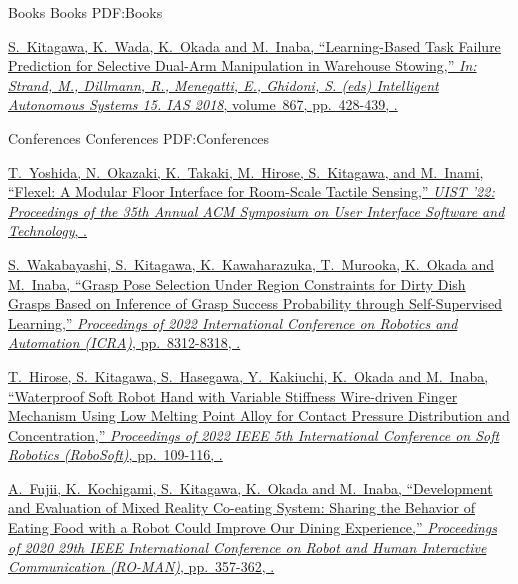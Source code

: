 \documentclass[letterpaper,MMMyyyy,nonstopmode]{simpleresumecv}
\begin{document}
\begin{Body}
\endgroup

\BigGap
\SubSection
{Books}
{Books}
{PDF:Books}

\begingroup

\BulletItem
\href{https://doi.org/10.1007/978-3-030-01370-7_34}
{\underline{S.~Kitagawa}, K.~Wada, K.~Okada and M.~Inaba,
``Learning-Based Task Failure Prediction for Selective Dual-Arm Manipulation in Warehouse Stowing,''
\textit{In: Strand, M., Dillmann, R., Menegatti, E., Ghidoni, S. (eds) Intelligent Autonomous Systems 15. IAS 2018},
volume~867,
pp.~428-439,
.}

\endgroup

\BigGap
\SubSection
{Conferences}
{Conferences}
{PDF:Conferences}

\begingroup

\BulletItem
\href{https://doi.org/10.1145/3526113.3545699}
{T.~Yoshida, N.~Okazaki, K.~Takaki, M.~Hirose, \underline{S.~Kitagawa}, and M.~Inami,
``Flexel: A Modular Floor Interface for Room-Scale Tactile Sensing,''
\textit{UIST '22: Proceedings of the 35th Annual ACM Symposium on User Interface Software and Technology},
.}

\BulletItem
\href{https://doi.org/10.1109/ICRA46639.2022.9812084}
{S.~Wakabayashi, \underline{S.~Kitagawa}, K.~Kawaharazuka, T.~Murooka, K.~Okada and M.~Inaba,
``Grasp Pose Selection Under Region Constraints for Dirty Dish Grasps Based on Inference of Grasp Success Probability through Self-Supervised Learning,''
\textit{Proceedings of 2022 International Conference on Robotics and Automation (ICRA)},
pp.~8312-8318,
.}

\BulletItem
\href{https://doi.org/10.1109/RoboSoft54090.2022.9762208}
{T.~Hirose, \underline{S.~Kitagawa}, S.~Hasegawa, Y.~Kakiuchi, K.~Okada and M.~Inaba,
``Waterproof Soft Robot Hand with Variable Stiffness Wire-driven Finger Mechanism Using Low Melting Point Alloy for Contact Pressure Distribution and Concentration,''
\textit{Proceedings of 2022 IEEE 5th International Conference on Soft Robotics (RoboSoft)},
pp.~109-116,
.}

\BulletItem
\href{https://doi.org/10.1109/RO-MAN47096.2020.9223518}
{A.~Fujii, K.~Kochigami, \underline{S.~Kitagawa}, K.~Okada and M.~Inaba,
``Development and Evaluation of Mixed Reality Co-eating System: Sharing the Behavior of Eating Food with a Robot Could Improve Our Dining Experience,''
\textit{Proceedings of 2020 29th IEEE International Conference on Robot and Human Interactive Communication (RO-MAN)},
pp.~357-362,
.}


\end{Body}
\end{document}
